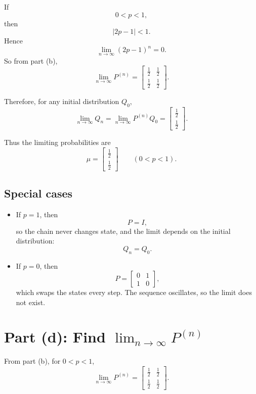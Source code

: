 \documentclass[11pt]{article}
\begin{document}
If
\[
    0<p<1,
\]
then
\[
    |2p-1|<1.
\]
Hence
\[
    \lim_{n\to\infty}(2p-1)^n = 0.
\]
So from part (b),
\[
    \lim_{n\to\infty}P^{(n)}
    =
    \begin{bmatrix}
        \frac12 & \frac12\\
        \frac12 & \frac12
    \end{bmatrix}.
\]

Therefore, for any initial distribution \(Q_0\),
\[
    \lim_{n\to\infty} Q_n
    =
    \lim_{n\to\infty} P^{(n)}Q_0
    =
    \begin{bmatrix}
        \frac12\\
        \frac12
    \end{bmatrix}.
\]

Thus the limiting probabilities are
\[
    \boxed{
    \mu=
    \begin{bmatrix}
        \frac12\\
        \frac12
    \end{bmatrix}
    \qquad (0<p<1)
    }.
\]

\subsection*{Special cases}

\begin{itemize}
    \item If \(p=1\), then
    \[
        P=I,
    \]
    so the chain never changes state, and the limit depends on the initial
    distribution:
    \[
        Q_n=Q_0.
    \]
    \item If \(p=0\), then
    \[
        P=
        \begin{bmatrix}
            0 & 1\\
            1 & 0
        \end{bmatrix},
    \]
    which swaps the states every step. The sequence oscillates, so the limit does
    not exist.
\end{itemize}

\section*{Part (d): Find \(\lim_{n\to\infty}P^{(n)}\)}

From part (b), for \(0<p<1\),
\[
    \boxed{
    \lim_{n\to\infty}P^{(n)}
    =
    \begin{bmatrix}
        \frac12 & \frac12\\
        \frac12 & \frac12
    \end{bmatrix}
    }.
\]
\end{document}
